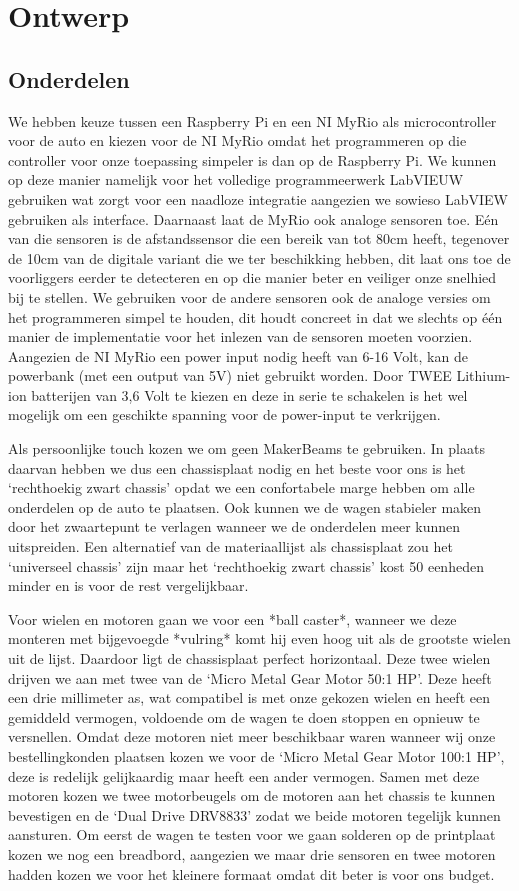 \documentclass[a4paper,twoside,kulak]{kulakreport}
\begin{document}
	 
\newpage
	
	\section{Ontwerp}
	\subsection{Onderdelen}
	We hebben keuze tussen een Raspberry Pi en een NI MyRio als microcontroller voor de auto en kiezen voor de NI MyRio omdat het programmeren op die controller voor onze toepassing simpeler is dan op de Raspberry Pi.
	We kunnen op deze manier namelijk voor het volledige programmeerwerk LabVIEUW gebruiken wat zorgt voor een naadloze integratie aangezien we sowieso LabVIEW gebruiken als interface.
	Daarnaast laat de MyRio ook analoge sensoren toe. 
	Eén van die sensoren is de afstandssensor die een bereik van tot 80cm heeft, tegenover de 10cm van de digitale variant die we ter beschikking hebben, dit laat ons toe de voorliggers eerder te detecteren en op die manier beter en veiliger onze snelhied bij te stellen.
	We gebruiken voor de andere sensoren ook de analoge versies om het programmeren simpel te houden, dit houdt concreet in dat we slechts op één manier de implementatie voor het inlezen van de sensoren moeten voorzien.
	Aangezien de NI MyRio een power input nodig heeft van 6-16 Volt, kan de powerbank (met een output van 5V) niet gebruikt worden.  Door TWEE Lithium-ion batterijen van 3,6 Volt te kiezen en deze in serie te schakelen is het wel mogelijk om een geschikte spanning voor de power-input te verkrijgen.
	
	Als persoonlijke touch kozen we om geen MakerBeams te gebruiken.
	In plaats daarvan hebben we dus een chassisplaat nodig en het beste voor ons is het `rechthoekig zwart chassis' opdat we een confortabele marge hebben om alle onderdelen op de auto te plaatsen. 
	Ook kunnen we de wagen stabieler maken door het zwaartepunt te verlagen wanneer we de onderdelen meer kunnen uitspreiden. 
	Een alternatief van de materiaallijst als chassisplaat zou het `universeel chassis' zijn maar het `rechthoekig zwart chassis' kost 50 eenheden minder en is voor de rest vergelijkbaar.
	
	Voor wielen en motoren gaan we voor een *ball caster*, wanneer we deze monteren met bijgevoegde *vulring* komt hij even hoog uit als de grootste wielen uit de lijst. 
	Daardoor ligt de chassisplaat perfect horizontaal.
	Deze twee wielen drijven we aan met twee van de `Micro Metal Gear Motor 50:1 HP'.
	Deze heeft een drie millimeter as, wat compatibel is met onze gekozen wielen en heeft een gemiddeld vermogen, voldoende om de wagen te doen stoppen en opnieuw te versnellen.
	Omdat deze motoren niet meer beschikbaar waren wanneer wij onze bestellingkonden plaatsen kozen we voor de `Micro Metal Gear Motor 100:1 HP', deze is redelijk gelijkaardig maar heeft een ander vermogen. 
	Samen met deze motoren kozen we twee motorbeugels om de motoren aan het chassis te kunnen bevestigen en de `Dual Drive DRV8833' zodat we beide motoren tegelijk kunnen aansturen.
	Om eerst de wagen te testen voor we gaan solderen op de printplaat kozen we nog een breadbord, aangezien we maar drie sensoren en twee motoren hadden kozen we voor het kleinere formaat omdat dit beter is voor ons budget. 
\end{document}
